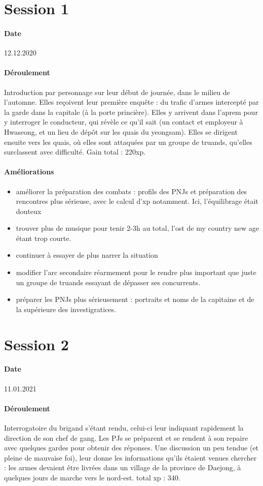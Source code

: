 \documentclass[10pt,a4paper]{book}
\begin{document}
\section{Session 1}
\paragraph{Date}12.12.2020
\paragraph{Déroulement} Introduction par personnage sur leur début de journée, dans le milieu de l'automne. Elles reçoivent leur première enquête : du trafic d'armes intercepté par la garde dans la capitale (à la porte princière). Elles y arrivent dans l'aprem pour y interroger le conducteur, qui révèle ce qu'il sait (un contact et employeur à Hwaseong, et un lieu de dépôt sur les quais du yeongsam). Elles se dirigent ensuite vers les quais, où elles sont attaquées par un groupe de truands, qu'elles surclassent avec difficulté. Gain total : 220xp.
\paragraph{Améliorations}
\begin{itemize}
\item améliorer la préparation des combats : profils des PNJs et préparation des rencontres plus sérieuse, avec le calcul d'xp notamment. Ici, l'équilibrage était douteux
\item trouver plus de musique pour tenir 2-3h au total, l'ost de my country new age étant trop courte.
\item continuer à essayer de plus narrer la situation
\item modifier l'arc secondaire réarmement pour le rendre plus important que juste un groupe de truands essayant de dépasser ses concurrents.
\item préparer les PNJs plus sérieusement : portraits et noms de la capitaine et de la supérieure des investigratices.
\end{itemize}
\section{Session 2}
\paragraph{Date}11.01.2021
\paragraph{Déroulement}
Interrogatoire du brigand s'étant rendu, celui-ci leur indiquant rapidement la direction de son chef de gang. Les PJs se préparent et se rendent à son repaire avec quelques gardes pour obtenir des réponses. Une discussion un peu tendue (et pleine de mauvaise foi), leur donne les informations qu'ils étaient venues chercher : les armes devaient être livrées dans un village de la province de Daejong, à quelques jours de marche vers le nord-est. total xp : 340.
\end{document}
